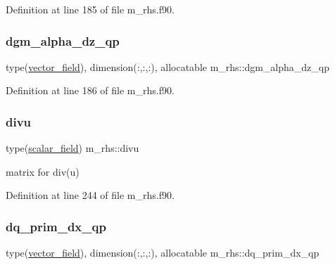 Definition at line 185 of file m\+\_\+rhs.\+f90.

\mbox{\label{namespacem__rhs_ade3320ea2b49d294014da588f54e09b4}} 
\subsubsection{\texorpdfstring{dgm\+\_\+alpha\+\_\+dz\+\_\+qp}{dgm\_alpha\_dz\_qp}}
{\footnotesize\ttfamily type(\hyperlink{structm__derived__types_1_1vector__field}{vector\+\_\+field}), dimension(\+:,\+:,\+:), allocatable m\+\_\+rhs\+::dgm\+\_\+alpha\+\_\+dz\+\_\+qp}



Definition at line 186 of file m\+\_\+rhs.\+f90.

\mbox{\label{namespacem__rhs_abf83c819d81616e9342f773a4067938c}} 
\subsubsection{\texorpdfstring{divu}{divu}}
{\footnotesize\ttfamily type(\hyperlink{structm__derived__types_1_1scalar__field}{scalar\+\_\+field}) m\+\_\+rhs\+::divu}



matrix for div(u) 



Definition at line 244 of file m\+\_\+rhs.\+f90.

\mbox{\label{namespacem__rhs_a48f3d69bb519043ca76fb10f8a2f44c0}} 
\subsubsection{\texorpdfstring{dq\+\_\+prim\+\_\+dx\+\_\+qp}{dq\_prim\_dx\_qp}}
{\footnotesize\ttfamily type(\hyperlink{structm__derived__types_1_1vector__field}{vector\+\_\+field}), dimension(\+:,\+:,\+:), allocatable m\+\_\+rhs\+::dq\+\_\+prim\+\_\+dx\+\_\+qp}




